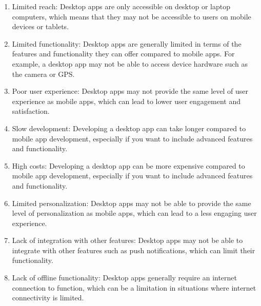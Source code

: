 \documentclass[12pt]{article}
\begin{document}
			\begin{enumerate}
				\item Limited reach: Desktop apps are only accessible on desktop or laptop computers, which means that they may not be accessible to users on mobile devices or tablets.
				\item Limited functionality: Desktop apps are generally limited in terms of the features and functionality they can offer compared to mobile apps. For example, a desktop app may not be able to access device hardware such as the camera or GPS.
				\item Poor user experience: Desktop apps may not provide the same level of user experience as mobile apps, which can lead to lower user engagement and satisfaction.
				\item Slow development: Developing a desktop app can take longer compared to mobile app development, especially if you want to include advanced features and functionality.
				\item High costs: Developing a desktop app can be more expensive compared to mobile app development, especially if you want to include advanced features and functionality.
				\item Limited personalization: Desktop apps may not be able to provide the same level of personalization as mobile apps, which can lead to a less engaging user experience.
				\item Lack of integration with other features: Desktop apps may not be able to integrate with other features such as push notifications, which can limit their functionality.
				\item Lack of offline functionality: Desktop apps generally require an internet connection to function, which can be a limitation in situations where internet connectivity is limited.
			\end{enumerate}
		
\end{document}
